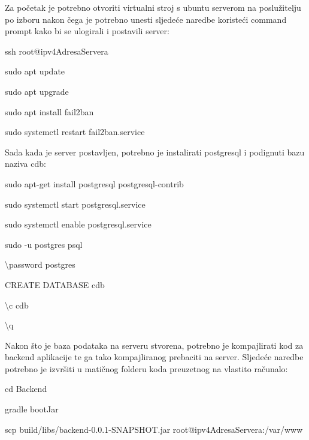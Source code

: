                 {Za početak je potrebno otvoriti virtualni stroj s ubuntu serverom na poslužitelju po izboru nakon čega je potrebno unesti sljedeće naredbe koristeći command prompt kako bi se ulogirali i postavili server:}

                \begin{packed_item}
        			\item {ssh root@ipv4AdresaServera}
        			\item {sudo apt update}
        			\item {sudo apt upgrade}
        			\item {sudo apt install fail2ban}
        			\item {sudo systemctl restart fail2ban.service}
        		\end{packed_item}

                {Sada kada je server postavljen, potrebno je instalirati postgresql i podignuti bazu naziva cdb:}

                \begin{packed_item}
        			\item {sudo apt-get install postgresql postgresql-contrib}
        			\item {sudo systemctl start postgresql.service}
        			\item {sudo systemctl enable postgresql.service}
        			\item {sudo -u postgres psql}
        			\item {\textbackslash password postgres}
        			\item {CREATE DATABASE cdb}
        			\item {\textbackslash c cdb}
        			\item {\textbackslash q}
        		\end{packed_item}

                {Nakon što je baza podataka na serveru stvorena, potrebno je kompajlirati kod za backend aplikacije te ga tako kompajliranog prebaciti na server. Sljedeće naredbe potrebno je izvršiti u matičnog folderu koda preuzetnog na vlastito računalo:}

                \begin{packed_item}
        			\item {cd Backend}
        			\item {gradle bootJar}
        			\item {scp build/libs/backend-0.0.1-SNAPSHOT.jar root@ipv4AdresaServera:/var/www}
        		\end{packed_item}

